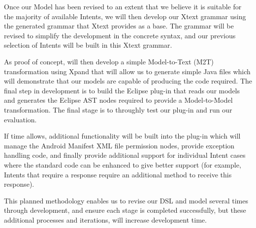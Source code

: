 Once our Model has been revised to an extent that we believe it is suitable for the majority of available Intents, we will then develop our Xtext grammar using the generated grammar that Xtext provides as a base. The grammar will be revised to simplify the development in the concrete syntax, and our previous selection of Intents will be built in this Xtext grammar.

As proof of concept, will then develop a simple Model-to-Text (M2T) transformation using Xpand that will allow us to generate simple Java files which will demonstrate that our models are capable of producing the code required. The final step in development is to build the Eclipse plug-in that reads our models and generates the Eclipse AST nodes required to provide a Model-to-Model transformation. The final stage is to throughly test our plug-in and run our evaluation.

If time allows, additional functionality will be built into the plug-in which will manage the Android Manifest XML file permission nodes, provide exception handling code, and finally provide additional support for individual Intent cases where the standard code can be enhanced to give better support (for example, Intents that require a response require an additional method to receive this response).

This planned methodology enables us to revise our DSL and model several times through development, and ensure each stage is completed successfully, but these additional processes and iterations, will increase development time.